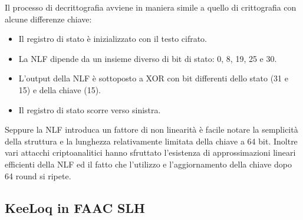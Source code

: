 Il processo di decrittografia avviene in maniera simile a quello di crittografia con alcune differenze chiave:
\begin{itemize}
  \item Il registro di stato è inizializzato con il testo cifrato.
  \item La NLF dipende da un insieme diverso di bit di stato: 0, 8, 19, 25 e 30.
  \item L’output della NLF è sottoposto a XOR con bit differenti dello stato (31 e 15) e della chiave (15).
  \item Il registro di stato scorre verso sinistra.
\end{itemize}
Seppure la NLF introduca un fattore di non linearità è facile notare la semplicità della struttura e la lunghezza relativamente limitata della chiave a 64 bit. Inoltre vari attacchi criptoanalitici hanno sfruttato l’esistenza di approssimazioni lineari efficienti della NLF ed il fatto che l’utilizzo e l’aggiornamento della chiave dopo 64 round si ripete.

\subsection{KeeLoq in FAAC SLH}
\label{sub:faacslh}

